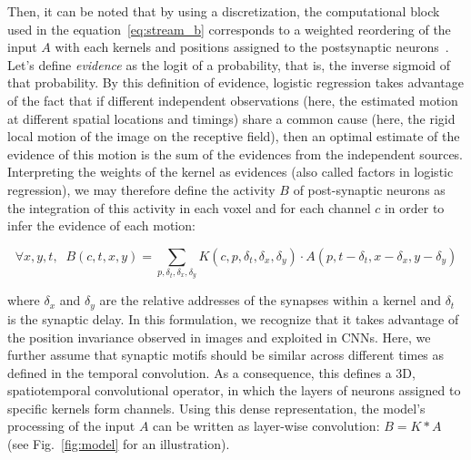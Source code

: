 \documentclass[default]{sn-jnl}%
\theoremstyle{thmstyleone}%
\theoremstyle{thmstyletwo}%
\theoremstyle{thmstylethree}%
\newcommand{\seeFig}[1]{see Fig.~\ref{fig:#1}}%
\newcommand{\synapticdelay}{\delta} %
\newcommand{\timev}{t} %
\newcommand{\kernel}{K} %
\newcommand{\class}{c} %
\begin{document}
Then, it can be noted that by using a discretization, the computational block used in the equation~\eqref{eq:stream_b} corresponds to a weighted reordering of the input $A$ with each kernels and positions assigned to the postsynaptic neurons~\citep{grimaldi_learning_2022}. Let's define \emph{evidence} as the logit of a probability, that is, the inverse sigmoid of that probability. By this definition of evidence, logistic regression takes advantage of the fact that if different independent observations (here, the estimated motion at different spatial locations and timings) share a common cause (here, the rigid local motion of the image on the receptive field), then an optimal estimate of the evidence of this motion is the sum of the evidences from the independent sources. Interpreting the weights of the kernel as evidences (also called factors in logistic regression), we may therefore define the activity $B$ of post-synaptic neurons as the integration of this activity in each voxel and for each channel $\class$ in order to infer the evidence of each motion:
%
\begin{linenomath*}
\begin{equation}\label{eq:kernel_b}
\forall x, y, \timev, \; \;
B(\class, \timev, x, y)
= \sum_{p, \synapticdelay_\timev, \delta_x, \delta_y} \kernel(\class, p, \synapticdelay_\timev, \delta_x, \delta_y) \cdot A(p, \timev-\synapticdelay_\timev, x - \delta_x, y - \delta_y)
\end{equation}
\end{linenomath*}
%
where $\delta_x$ and $\delta_y$ are the relative addresses of the synapses within a kernel and $\delta_\timev$ is the synaptic delay. In this formulation, we recognize that it takes advantage of the position invariance observed in images and exploited in CNNs. Here, we further assume that synaptic motifs should be similar across different times as defined in the temporal convolution. As a consequence, this defines a 3D, spatiotemporal convolutional operator, in which the layers of neurons assigned to specific kernels form channels. Using this dense representation, the model's processing of the input $A$ can be written as layer-wise convolution: $B = \kernel \ast A$ (\seeFig{model} for an illustration). 
\end{document}

